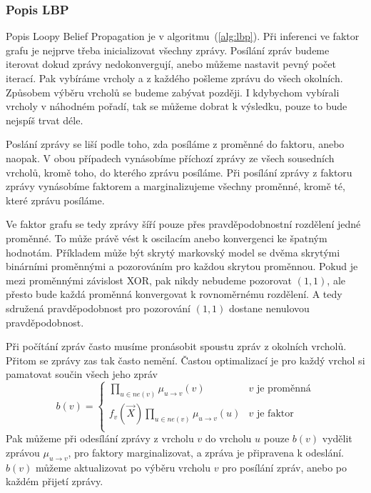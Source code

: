 \subsubsection{Popis LBP}

Popis Loopy Belief Propagation je v algoritmu~(\ref{alg:lbp}).
Při inferenci ve faktor grafu je nejprve třeba inicializovat všechny zprávy.
Posílání zpráv budeme iterovat dokud zprávy nedokonvergují, anebo můžeme nastavit pevný počet iterací.
Pak vybíráme vrcholy a z každého pošleme zprávu do všech okolních.
Způsobem výběru vrcholů se budeme zabývat později.
I kdybychom vybírali vrcholy v náhodném pořadí, tak se můžeme dobrat k výsledku, pouze to bude nejspíš trvat déle.

Poslání zprávy se liší podle toho, zda posíláme z proměnné do faktoru, anebo naopak.
V obou případech vynásobíme příchozí zprávy ze všech sousedních vrcholů, kromě toho, do kterého zprávu posíláme.
Při posílání zprávy z faktoru zprávy vynásobíme faktorem a marginalizujeme všechny proměnné, kromě té, které zprávu posíláme.

Ve faktor grafu se tedy zprávy šíří pouze přes pravděpodobnostní rozdělení jedné proměnné.
To může právě vést k oscilacím anebo konvergenci ke špatným hodnotám. 
Příkladem může být skrytý markovský model se dvěma skrytými binárními proměnnými a pozorováním pro každou skrytou proměnnou.
Pokud je mezi proměnnými závislost XOR, pak nikdy nebudeme pozorovat $(1, 1)$, ale přesto bude každá proměnná konvergovat k rovnoměrnému rozdělení. A tedy sdružená pravděpodobnost pro pozorování $(1, 1)$ dostane nenulovou pravděpodobnost.

Při počítání zpráv často musíme pronásobit spoustu zpráv z okolních vrcholů.
Přitom se zprávy zas tak často nemění.
Častou optimalizací je pro každý vrchol si pamatovat součin všech jeho zpráv
\begin{equation}
    b(v) = \begin{cases}
        \prod_{u \in ne(v)} \mu_{u \rightarrow v}(v) & \mbox{$v$ je proměnná} \\
        f_v(\vec{X}) \prod_{u \in ne(v)} \mu_{u \rightarrow v}(u) & \mbox{$v$ je faktor} \\
    \end{cases}
\end{equation}
Pak můžeme při odesílání zprávy z vrcholu $v$ do vrcholu $u$ pouze $b(v)$ vydělit zprávou $\mu_{u \rightarrow v}$, pro faktory marginalizovat, a zpráva je připravena k odeslání.
$b(v)$ můžeme aktualizovat po výběru vrcholu $v$ pro posílání zpráv, anebo po každém přijetí zprávy.

